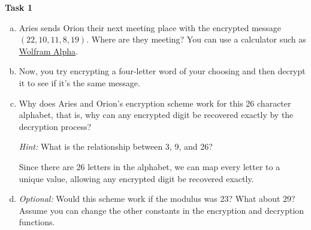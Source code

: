 \documentclass[12pt,letterpaper]{article}
\newif\ifsol
\newcommand{\solu}[2]{ \begin{mdframed} \ifsol #2 \else \vspace{#1} \fi \end{mdframed} }
\begin{document}
    \textbf{Task 1}
    \begin{enumerate}[a.]
        \item Aries sends Orion their next meeting place with the encrypted message $(22, 10, 11, 8, 19)$. Where are they meeting? You can use a calculator such as \href{https://www.wolframalpha.com/}{Wolfram Alpha}.
    
    \solu{1cm}{PLUTO
    
    \textrm{rem}(9*22, 26) = 16 \\
    \textrm{rem}(9*10, 26) = 12 \\
    \textrm{rem}(9*11, 26) = 21 \\
    \textrm{rem}(9*8, 26) = 20 \\
    \textrm{rem}(9*19, 26) = 15
    }
    
    \item Now, you try encrypting a four-letter word of your choosing and then decrypt it to see if it's the same message.
    
    \solu{2cm}{
    Almost any four-letter words the students pick is fine, as long as their work looks OK and they seem to understand the process.}
    
    \item Why does Aries and Orion’s encryption scheme work for this 26 character alphabet, that is, why can any encrypted digit be recovered exactly by the decryption process? 
    
    \textit{Hint:} What is the relationship between 3, 9, and 26?
    
    \solu{2cm}{
    First, we note that 3 has a multiplicative inverse mod 26 (specifically, 9). Therefore, rem(3x, 26) has a distinct answer for each x in [0, 25]. The map $x \to 3x \pmod{26}$ is a bijection with inverse $x \to 9x \pmod{26}$.} 
    
    Since there are 26 letters in the alphabet, we can map every letter to a unique value, allowing any encrypted digit be recovered exactly.
    
    \item \textit{Optional:} Would this scheme work if the modulus was 23? What about 29? Assume you can change the other constants in the encryption and decryption functions.
    
    \solu{2cm}{
    It would not work if the modulus was 23 because the range of the function would be reduced to $[0, 22]$. We'll lose some of the letters towards the end of the alphabet.
    
    However, it \textit{would} work with $m=29$—in fact, we'll be able to support 3 extra characters to take on the values 27, 28, and 29.
    }
    \end{enumerate}
    
\end{document}
